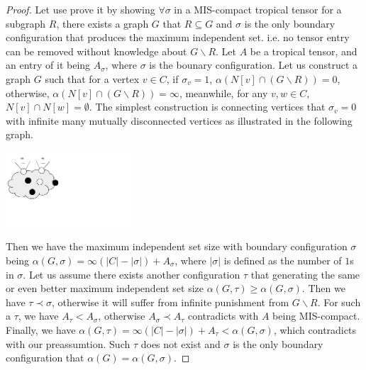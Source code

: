 \documentclass[review,onefignum,onetabnum]{siamart190516}
\newcommand{\<}{\langle}
\renewcommand{\>}{\rangle}
\begin{document}
\begin{proof}
    Let use prove it by showing $\forall \sigma$ in a MIS-compact tropical tensor for a subgraph $R$, there exists a graph $G$ that $R\subseteq G$ and $\sigma$ is the only boundary configuration that produces the maximum independent set.
    i.e. no tensor entry can be removed without knowledge about $G\backslash R$.
    Let $A$ be a tropical tensor, and an entry of it being $A_{\sigma}$, where $\sigma$ is the bounary configuration.
    Let us construct a graph $G$ such that for a vertex $v \in C$, if $\sigma_v=1$, $\alpha(N[v] \cap (G \backslash R)) = 0$, otherwise, $\alpha(N[v] \cap (G\backslash R)) = \infty$, meanwhile, for any $v, w \in C$, $N[v]\cap N[w] = \emptyset$.
    The simplest construction is connecting vertices that $\sigma_v=0$ with infinite many mutually disconnected vertices as illustrated in the following graph.

    \centerline{\includegraphics[width=0.35\textwidth, trim={0cm 2cm 6cm 0cm}, clip]{proofoptimal.pdf}}

    Then we have the maximum independent set size with boundary configuration $\sigma$ being $\alpha(G,\sigma) = \infty (|C|-|\sigma|) + A_{\sigma}$,
    where $|\sigma|$ is defined as the number of $1$s in $\sigma$.
    Let us assume there exists another configuration $\tau$ that generating the same or even better maximum independent set size $\alpha(G, \tau) \geq \alpha(G, \sigma)$.
    Then we have $\tau \prec \sigma$, otherwise it will suffer from infinite punishment from $G\backslash R$.
    For such a $\tau$, we have $A_\tau < A_\sigma$, otherwise $A_\sigma \prec A_\tau$ contradicts with $A$ being MIS-compact.
    Finally, we have $\alpha(G,\tau) = \infty (|C|-|\sigma|) + A_{\tau} < \alpha(G,\sigma)$, which contradicts with our preassumtion. Such $\tau$ does not exist and $\sigma$ is the only boundary configuration that $\alpha(G) = \alpha(G, \sigma)$.
\end{proof}
\end{document}
